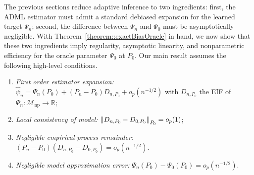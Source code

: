\documentclass[11pt]{article}
\theoremstyle{definition}
\begin{document}
 




The previous sections reduce adaptive inference to two ingredients: first, the ADML estimator must admit a standard debiased expansion for the learned target \(\Psi_n\); second, the difference between \(\Psi_n\) and \(\Psi_0\) must be asymptotically negligible. With Theorem~\ref{theorem::exactBiasOracle} in hand, we now show that these two ingredients imply regularity, asymptotic linearity, and nonparametric efficiency for the oracle parameter \(\Psi_0\) at \(P_0\). Our main result assumes the following high-level conditions.




 \begin{enumerate}[label=(C\arabic*), ref=C\arabic*,series=condB]

\item \textit{First order estimator expansion:}  $\widehat{\psi}_n = \Psi_n(P_0) + (P_n-P_0) D_{n,P_0} + o_p(n^{-1/2})$ with $D_{n,P_0}$ the EIF of $\Psi_n:\mathcal{M}_{\mathrm{np}}\rightarrow\mathbb{R}$;\label{cond::debiased}%
\item \textit{Local consistency of model:}  $ \norm{D_{n,P_0}- D_{0,P_{0}}}_{P_0}  = o_p(1)$;\label{cond::consDn}
\item \textit{Negligible empirical process remainder:}  $(P_n - P_0) \left(D_{n,P_0} - D_{0,P_0}\right) =  o_p(n^{-1/2})$. 
\label{cond::Donsker}
\item \textit{Negligible model approximation error:}  $\Psi_n(P_0) - \Psi_0(P_0)  =o_p(n^{-1/2})$.\label{cond::doubleRemrootnFinal}
 
\end{enumerate}
\end{document}
